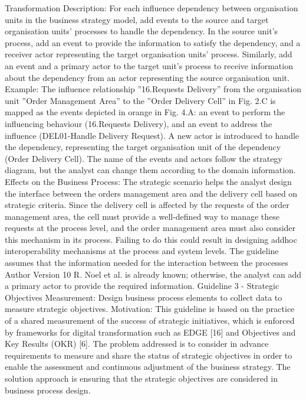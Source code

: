 Transformation Description: For each influence dependency between organisation units in the business strategy model, add events to the source and
target organisation units’ processes to handle the dependency. In the source
unit’s process, add an event to provide the information to satisfy the dependency, and a receiver actor representing the target organisation units’ process.
Similarly, add an event and a primary actor to the target unit’s process to receive information about the dependency from an actor representing the source
organisation unit.
Example: The influence relationship ”16.Requests Delivery” from the organisation unit ”Order Management Area” to the ”Order Delivery Cell” in Fig.
2.C is mapped as the events depicted in orange in Fig. 4.A: an event to perform
the influencing behaviour (16.Requests Delivery), and an event to address the
influence (DEL01-Handle Delivery Request). A new actor is introduced to handle the dependency, representing the target organisation unit of the dependency
(Order Delivery Cell). The name of the events and actors follow the strategy
diagram, but the analyst can change them according to the domain information.
Effects on the Business Process: The strategic scenario helps the analyst
design the interface between the orders management area and the delivery cell
based on strategic criteria. Since the delivery cell is affected by the requests of the
order management area, the cell must provide a well-defined way to manage these
requests at the process level, and the order management area must also consider
this mechanism in its process. Failing to do this could result in designing addhoc interoperability mechanisms at the process and system levels. The guideline
assumes that the information needed for the interaction between the processes
Author Version
10 R. Noel et al.
is already known; otherwise, the analyst can add a primary actor to provide the
required information.
Guideline 3 - Strategic Objectives Measurement: Design business process
elements to collect data to measure strategic objectives.
Motivation: This guideline is based on the practice of a shared measurement
of the success of strategic initiatives, which is enforced by frameworks for digital transformation such as EDGE [16] and Objectives and Key Results (OKR)
[6]. The problem addressed is to consider in advance requirements to measure
and share the status of strategic objectives in order to enable the assessment
and continuous adjustment of the business strategy. The solution approach is
ensuring that the strategic objectives are considered in business process design.
